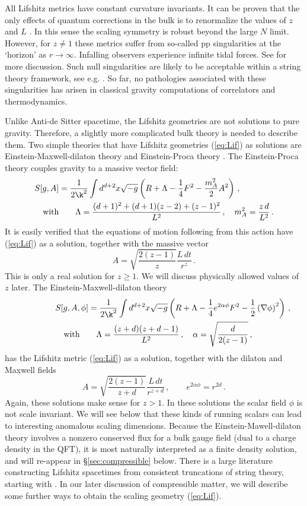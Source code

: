 \documentclass[10pt, oneside]{book}
\def\be{\begin{equation}}
\def\ee{\end{equation}}
\newcommand{\bea}{\begin{eqnarray}}
\newcommand{\eea}{\end{eqnarray}}
\begin{document}
\begin{doublespace}
All Lifshitz metrics have constant curvature invariants. It can be proven that the only effects of quantum corrections in the bulk is to renormalize the values of $z$ and $L$ \cite{Adams:2008zk}. In this sense the scaling symmetry is robust beyond the large $N$ limit. However, for $z \neq 1$ these metrics suffer from so-called pp singularities at the `horizon' as $r \to \infty$. Infalling observers experience infinite tidal forces. See \cite{Hartnoll:2009sz} for more discussion. Such null singularities are likely to be acceptable within a string theory framework, see e.g. \cite{Horowitz:1997uc, Bao:2012yt}. So far, no pathologies associated with these singularities has arisen in classical gravity computations of correlators and thermodynamics.

Unlike Anti-de Sitter spacetime, the Lifshitz geometries are not solutions to pure gravity. Therefore, a slightly more complicated bulk theory is needed to describe them. Two simple theories that have Lifshitz geometries (\ref{eq:Lif}) as solutions are Einstein-Maxwell-dilaton theory \cite{Taylor:2008tg, Goldstein:2009cv} and Einstein-Proca theory \cite{Taylor:2008tg}. The Einstein-Proca theory couples gravity to a massive vector field:
\bea
\lefteqn{S[g,A] = \frac{1}{2 \k^2} \int d^{d+2}x \sqrt{-g} \left( R + \Lambda  - \frac{1}{4} F^2 -  \frac{m^2_A}{2} A^2 \right) \,,}\\
&& \text{with} \qquad \Lambda =  \frac{(d+1)^2 + (d+1)(z-2) + (z-1)^2}{L^2} \,, \quad m^2_A = \frac{z \, d}{L^2} \,.
\eea
It is easily verified that the equations of motion following from this action have (\ref{eq:Lif}) as a solution, together with the massive vector
\be
A = \sqrt{\frac{2(z-1)}{z}} \frac{L \, dt}{r^z} \,.
\ee
This is only a real solution for $z \geq 1$. We will discuss physically allowed values of $z$ later. The Einstein-Maxwell-dilaton theory
\bea
\lefteqn{S[g,A,\phi] =\frac{1}{2 \k^2} \int d^{d+2}x \sqrt{-g} \left( R + \Lambda  - \frac{1}{4} e^{2 \alpha \phi} F^2 - \frac{1}{2} \left( \nabla \phi \right)^2 \right) \,,} \\
&& \text{with} \qquad \Lambda =  \frac{(z+d)(z+d-1)}{L^2} \,, \quad \alpha= \sqrt{\frac{d}{2(z-1)}} \,,
\eea
has the Lifshitz metric (\ref{eq:Lif}) as a solution, together with the dilaton and Maxwell fields
\be
A = \sqrt{\frac{2(z-1)}{z+d}} \frac{L \, dt}{r^{z+d}} \,, \qquad e^{2 \alpha \phi} = r^{2 d} \,. 
\ee
Again, these solutions make sense for $z > 1$. In these solutions the scalar field $\phi$ is not scale invariant. We will see below that these kinds of running scalars can lead to interesting anomalous scaling dimensions. Because the Einstein-Mawell-dilaton theory involves a nonzero conserved flux for a bulk gauge field (dual to a charge density in the QFT), it is most naturally interpreted as a finite density solution, and will re-appear in \S\ref{sec:compressible} below. There is a large literature constructing Lifshitz spacetimes from consistent truncations of string theory, starting with \cite{Balasubramanian:2010uk, Donos:2010tu}. In our later discussion of compressible matter, we will describe some further ways to obtain the scaling geometry (\ref{eq:Lif}).


\end{doublespace}
\end{document}
